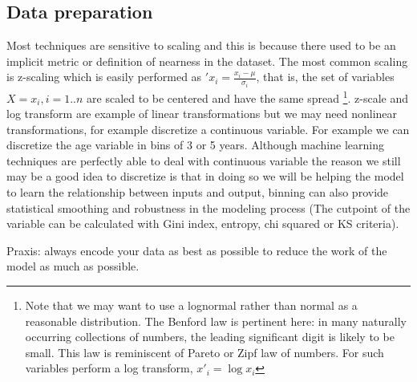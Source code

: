 \documentclass[11pt]{article}
\begin{document}
\subsection{Data preparation}
Most techniques are sensitive to scaling \cite{wu2012foundations} and this is because there used to be an implicit metric or definition of nearness in the dataset. The most common scaling is z-scaling which is easily performed as $\prime{x}_i=\frac{x_i -\mu}{\sigma_i}$, that is, the set of variables $X = x_i, i=1..n$ are scaled to be centered and have the same spread \footnote{Note that we may want to use a lognormal rather than normal as a reasonable distribution. The Benford law is pertinent here: in many naturally occurring collections of numbers, the leading significant digit is likely to be small. This law is reminiscent of Pareto or Zipf law of numbers. For such variables perform a log transform, $x'_i = \log x_i$}.
z-scale and log transform are example of linear transformations but we may need nonlinear transformations, for example discretize a continuous variable. For example we can discretize the age variable in bins of 3 or 5 years. Although machine learning techniques are perfectly able to deal with continuous variable the reason we still may be a good idea to discretize is that in doing so we will be helping the model to learn the relationship between inputs and output, binning can also provide statistical smoothing and robustness in the modeling process (The cutpoint of the variable can be calculated with Gini index, entropy, chi squared or KS criteria).

Praxis: always encode your data as best as possible to reduce the work of the model as much as possible.
\end{document}
